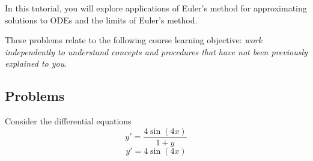 		\begin{objectives}
			In this tutorial, you will explore applications of Euler's method for approximating solutions to ODEs
			and the limits of Euler's method.

			These problems relate to the following course learning
			objective: \textit{work independently to understand concepts and procedures that have not
			been previously explained to you}.
		\end{objectives}



		\subsection*{Problems}
		
		Consider the differential equations
		\begin{equation}
			\label{tut1-ode}
			y'=\frac{4\sin(4x)}{1+y}
		\end{equation}
		\begin{equation}
			\label{tut1-ode2}
			y'=4\sin(4x)
		\end{equation}

